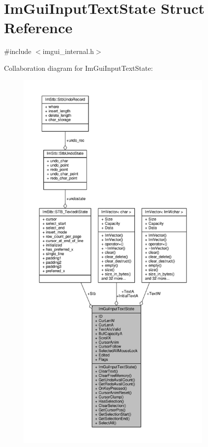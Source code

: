\hypertarget{structImGuiInputTextState}{}\section{Im\+Gui\+Input\+Text\+State Struct Reference}
\label{structImGuiInputTextState}


{\ttfamily \#include $<$imgui\+\_\+internal.\+h$>$}



Collaboration diagram for Im\+Gui\+Input\+Text\+State\+:
\nopagebreak
\begin{figure}[H]
\begin{center}
\leavevmode
\includegraphics[height=550pt]{structImGuiInputTextState__coll__graph}
\end{center}
\end{figure}
